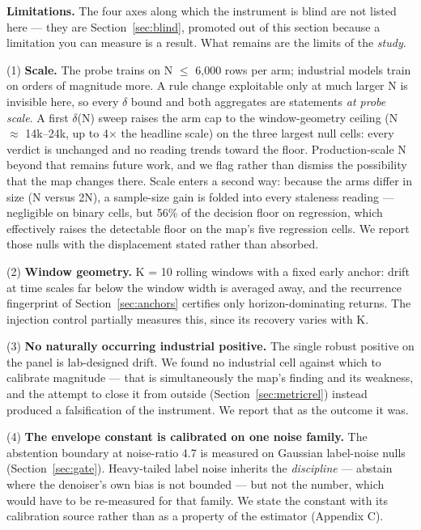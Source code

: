 \documentclass[10pt]{article} %
\begin{document}
\textbf{Limitations.} The four axes along which the instrument is blind are not listed here --- they are
Section~\ref{sec:blind}, promoted out of this section because a limitation you can measure is a result. What remains are
the limits of the \emph{study}.

(1) \textbf{Scale.} The probe trains on N $\le$ 6,000 rows per arm; industrial models train on orders of
magnitude more. A rule change exploitable only at much larger N is invisible here, so every $\delta$ bound
and both aggregates are statements \emph{at probe scale}. A first $\delta$(N) sweep raises the arm cap to the
window-geometry ceiling (N $\approx$ 14k--24k, up to 4$\times$ the headline scale) on the three largest null cells:
every verdict is unchanged and no reading trends toward the floor. Production-scale N beyond that
remains future work, and we flag rather than dismiss the possibility that the map changes there.
Scale enters a second way: because the arms differ in size (N versus 2N), a sample-size gain is
folded into every staleness reading --- negligible on binary cells, but 56\% of the decision floor on
regression, which effectively raises the detectable floor on the map's five regression cells. We
report those nulls with the displacement stated rather than absorbed.

(2) \textbf{Window geometry.} K = 10 rolling windows with a fixed early anchor: drift at time scales far
below the window width is averaged away, and the recurrence fingerprint of Section~\ref{sec:anchors} certifies only
horizon-dominating returns. The injection control partially measures this, since its recovery
varies with K.

(3) \textbf{No naturally occurring industrial positive.} The single robust positive on the panel is
lab-designed drift. We found no industrial cell against which to calibrate magnitude --- that is
simultaneously the map's finding and its weakness, and the attempt to close it from outside
(Section~\ref{sec:metricrel}) instead produced a falsification of the instrument. We report that as the outcome it was.

(4) \textbf{The envelope constant is calibrated on one noise family.} The abstention boundary at
noise-ratio 4.7 is measured on Gaussian label-noise nulls (Section~\ref{sec:gate}). Heavy-tailed label noise inherits
the \emph{discipline} --- abstain where the denoiser's own bias is not bounded --- but not the number, which
would have to be re-measured for that family. We state the constant with its calibration source
rather than as a property of the estimator (Appendix C).
\end{document}
